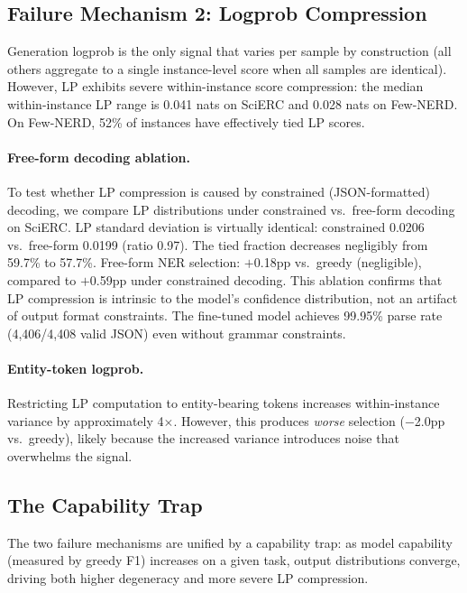 \documentclass[11pt,twocolumn]{article}
\begin{document}
\subsection{Failure Mechanism 2: Logprob Compression}
\label{sec:compression}

Generation logprob is the only signal that varies per sample by construction (all others aggregate to a single instance-level score when all samples are identical).
However, LP exhibits severe within-instance score compression: the median within-instance LP range is 0.041 nats on SciERC and 0.028 nats on Few-NERD.
On Few-NERD, 52\% of instances have effectively tied LP scores.

\paragraph{Free-form decoding ablation.}
To test whether LP compression is caused by constrained (JSON-formatted) decoding, we compare LP distributions under constrained vs.\ free-form decoding on SciERC.
LP standard deviation is virtually identical: constrained 0.0206 vs.\ free-form 0.0199 (ratio 0.97).
The tied fraction decreases negligibly from 59.7\% to 57.7\%.
Free-form NER selection: $+$0.18pp vs.\ greedy (negligible), compared to $+$0.59pp under constrained decoding.
This ablation confirms that LP compression is intrinsic to the model's confidence distribution, not an artifact of output format constraints.
The fine-tuned model achieves 99.95\% parse rate (4,406/4,408 valid JSON) even without grammar constraints.

\paragraph{Entity-token logprob.}
Restricting LP computation to entity-bearing tokens increases within-instance variance by approximately 4$\times$.
However, this produces \emph{worse} selection ($-$2.0pp vs.\ greedy), likely because the increased variance introduces noise that overwhelms the signal.

\subsection{The Capability Trap}
\label{sec:trap}

The two failure mechanisms are unified by a capability trap: as model capability (measured by greedy F1) increases on a given task, output distributions converge, driving both higher degeneracy and more severe LP compression.
\end{document}
